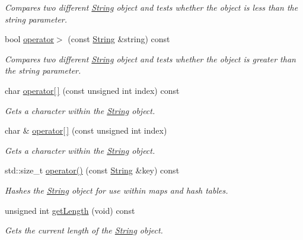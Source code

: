 \begin{DoxyCompactItemize}
\begin{DoxyCompactList}\small\item\em Compares two different \hyperlink{classsparky_1_1_string}{String} object and tests whether the object is less than the string parameter. \end{DoxyCompactList}\item 
bool \hyperlink{classsparky_1_1_string_a85abe1d207c04222d3488268c83fd1cd}{operator$>$} (const \hyperlink{classsparky_1_1_string}{String} \&string) const 
\begin{DoxyCompactList}\small\item\em Compares two different \hyperlink{classsparky_1_1_string}{String} object and tests whether the object is greater than the string parameter. \end{DoxyCompactList}\item 
char \hyperlink{classsparky_1_1_string_abfc8fc0e99a333569cbfddb51a2e0a3e}{operator\mbox{[}$\,$\mbox{]}} (const unsigned int index) const 
\begin{DoxyCompactList}\small\item\em Gets a character within the \hyperlink{classsparky_1_1_string}{String} object. \end{DoxyCompactList}\item 
char \& \hyperlink{classsparky_1_1_string_a0c241d697110cd36e73a53cf7a94f2a1}{operator\mbox{[}$\,$\mbox{]}} (const unsigned int index)
\begin{DoxyCompactList}\small\item\em Gets a character within the \hyperlink{classsparky_1_1_string}{String} object. \end{DoxyCompactList}\item 
std\+::size\+\_\+t \hyperlink{classsparky_1_1_string_a759ab7d07774e0a3caefcbd3679e643a}{operator()} (const \hyperlink{classsparky_1_1_string}{String} \&key) const 
\begin{DoxyCompactList}\small\item\em Hashes the \hyperlink{classsparky_1_1_string}{String} object for use within maps and hash tables. \end{DoxyCompactList}\item 
unsigned int \hyperlink{classsparky_1_1_string_ae9314e5cbcc07718707462f4da0b4cea}{get\+Length} (void) const 
\begin{DoxyCompactList}\small\item\em Gets the current length of the \hyperlink{classsparky_1_1_string}{String} object. \end{DoxyCompactList}\item 

\end{DoxyCompactItemize}

